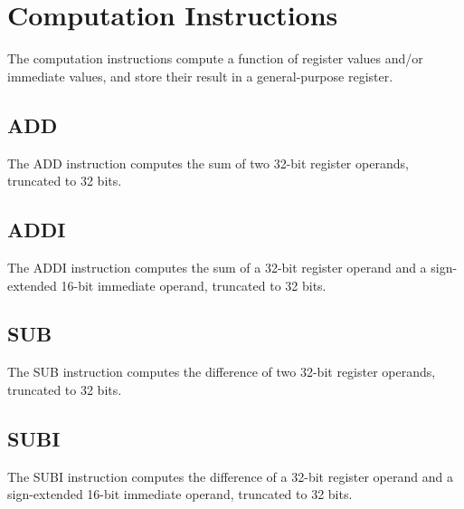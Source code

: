 \section{Computation Instructions}

\newcommand{\rdivzero}{\effect if $R_y=0$ then trigger a \name{Division by Zero Fault}}
\newcommand{\idivzero}{\effect if $y=0$ then trigger a \name{Division by Zero Fault}}

The computation instructions compute a function of register values and/or immediate values, and store their result in a general-purpose register.

\subsection{ADD}

The ADD instruction computes the sum of two 32-bit register operands, truncated to 32 bits.\\



\subsection{ADDI}

The ADDI instruction computes the sum of a 32-bit register operand and a sign-extended 16-bit immediate operand, truncated to 32 bits.\\



\subsection{SUB}

The SUB instruction computes the difference of two 32-bit register operands, truncated to 32 bits.\\



\subsection{SUBI}

The SUBI instruction computes the difference of a 32-bit register operand and a sign-extended 16-bit immediate operand, truncated to 32 bits.\\

